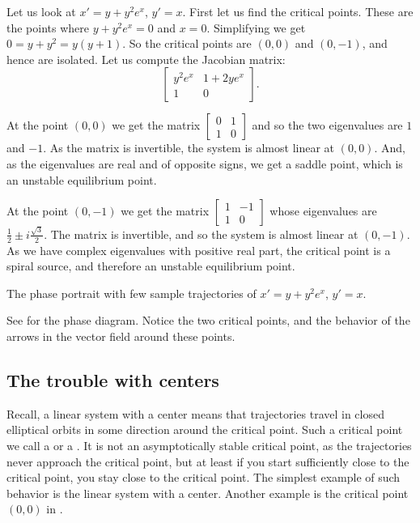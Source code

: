 \begin{example} \label{example:nlin-withexp}
Let us look at
$x'=y+y^2e^x$,
$y'=x$.  First let us find the critical points.  These are the points where
$y+y^2e^x = 0$ and $x=0$.  Simplifying we get $0=y+y^2 = y(y+1)$.  So the
critical points are $(0,0)$ and $(0,-1)$, and hence are isolated.  Let us
compute the Jacobian matrix:
\begin{equation*}
\begin{bmatrix}
y^2e^x & 1+2ye^x \\
1 & 0
\end{bmatrix}.
\end{equation*}

At the point $(0,0)$ we get the matrix
$\left[ \begin{smallmatrix} 0 & 1 \\ 1 & 0 \end{smallmatrix} \right]$ and
so the two eigenvalues are $1$ and $-1$.  As the matrix is invertible, the system is almost linear
at $(0,0)$.  And, as the eigenvalues are real
and of opposite signs, we get a saddle point, which is an unstable
equilibrium point.

At the point $(0,-1)$ we get the matrix
$\left[ \begin{smallmatrix} 1 & -1 \\ 1 & 0 \end{smallmatrix} \right]$ whose
eigenvalues are $\frac{1}{2} \pm i \frac{\sqrt{3}}{2}$.
The matrix is invertible, and so the system is almost linear at $(0,-1)$.
As we have complex eigenvalues with positive real part, the critical
point is a spiral source, and therefore an unstable equilibrium point.

\begin{myfig}
\capstart
{}
\caption{The phase portrait with few sample trajectories of 
$x'=y+y^2e^x$, $y'=x$.  \label{fig:nlin-ex813}}
\end{myfig}

See  for the phase diagram.  Notice the two
critical points, and the behavior of the arrows in the vector field around
these points.
\end{example}

\subsection{The trouble with centers}

Recall, a linear system with a center means that trajectories
travel in closed elliptical orbits
in some direction around the critical point.  Such
a critical point we call a \emph{} or
a \emph{}.  It is not an asymptotically 
stable critical point, as the trajectories never approach the critical
point, but at least if you start sufficiently close to the critical point,
you stay close to the critical point.  The simplest example of such
behavior is the linear system with a center.  Another
example is the critical point $(0,0)$ in
.

